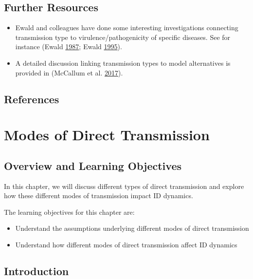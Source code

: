 \documentclass[]{article}
\providecommand{\tightlist}{%
  \setlength{\itemsep}{0pt}\setlength{\parskip}{0pt}}
\theoremstyle{definition}
\theoremstyle{definition}
\theoremstyle{definition}
\theoremstyle{remark}
\begin{document}
\subsection{Further Resources}\label{further-resources-4}

\begin{itemize}
\tightlist
\item
  Ewald and colleagues have done some interesting investigations
  connecting transmission type to virulence/pathogenicity of specific
  diseases. See for instance (Ewald
  \protect\hyperlink{ref-ewald87}{1987}; Ewald
  \protect\hyperlink{ref-ewald95}{1995}).
\item
  A detailed discussion linking transmission types to model alternatives
  is provided in (McCallum et al.
  \protect\hyperlink{ref-mccallum17}{2017}).
\end{itemize}

\subsection{References}\label{references-5}

\section{Modes of Direct
Transmission}\label{modes-of-direct-transmission}

\subsection{Overview and Learning
Objectives}\label{overview-and-learning-objectives-5}

In this chapter, we will discuss different types of direct transmission
and explore how these different modes of transmission impact ID
dynamics.

The learning objectives for this chapter are:

\begin{itemize}
\tightlist
\item
  Understand the assumptions underlying different modes of direct
  transmission
\item
  Understand how different modes of direct transmission affect ID
  dynamics
\end{itemize}

\subsection{Introduction}\label{introduction-5}
\end{document}
